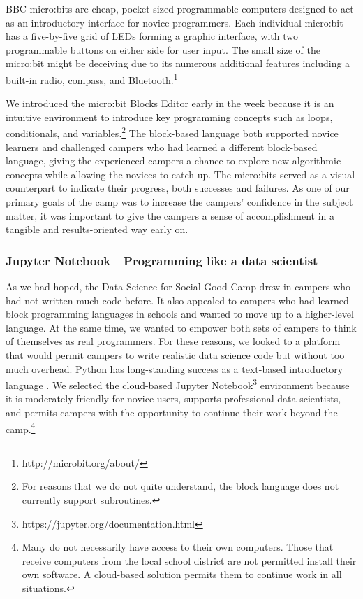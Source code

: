BBC micro:bits are cheap, pocket-sized programmable computers
designed to act as an introductory interface for novice programmers.
Each individual micro:bit has a five-by-five grid of LEDs forming
a graphic interface, with two programmable buttons on either side
for user input.  The small size of the micro:bit might be deceiving
due to its numerous additional features including a built-in radio,
compass, and Bluetooth.\footnote{http://microbit.org/about/}

We introduced the micro:bit Blocks Editor early in the week because
it is an intuitive environment to introduce key programming
concepts such as loops, conditionals, and variables.\footnote{For
reasons that we do not quite understand, the block language does
not currently support subroutines.}  The block-based language both
supported novice learners and challenged campers who had learned 
a different block-based language, giving the experienced campers
a chance to explore new algorithmic concepts while allowing the
novices to catch up.  The micro:bits served as a visual counterpart
to indicate their progress, both successes and failures.  As one
of our primary goals of the camp was to increase the campers'
confidence in the subject matter, it was important to give the
campers a sense of accomplishment in a tangible and results-oriented
way early on.

\subsubsection{Jupyter Notebook---Programming like a data scientist}

As we had hoped, the Data Science for Social Good Camp drew in
campers who had not written much code before.  It also
appealed to campers who had learned block programming languages
in schools and wanted to move up to a higher-level language.  At
the same time, we wanted to empower both sets of campers to think
of themselves as real programmers.  For these reasons, we looked
to a platform that would permit campers to write realistic data
science code but without too much overhead.  Python has
long-standing success as a text-based introductory language
\cite{Guo2014}.  We selected the cloud-based Jupyter
Notebook\footnote{https://jupyter.org/documentation.html} environment
because it is moderately friendly for novice users, supports
professional data scientists, and permits campers with the opportunity
to continue their work beyond the camp.\footnote{Many do not 
necessarily have access to their own computers.  Those that receive 
computers from the local school district are not permitted install 
their own software.  A cloud-based solution permits them to continue
work in all situations.}

